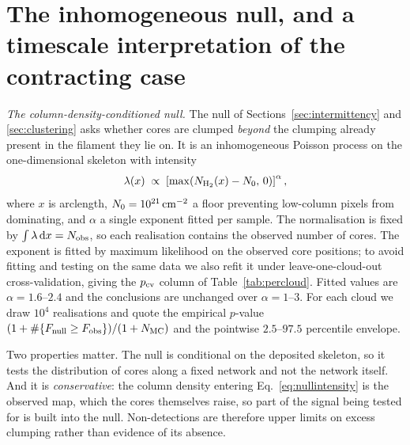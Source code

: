 \documentclass[usenatbib,twoside,twocolumn]{mnras}
\begin{document}
\section{The inhomogeneous null, and a timescale interpretation of the contracting case}
\label{sec:nullspec}

\emph{The column-density-conditioned null.} The null of Sections~\ref{sec:intermittency} and \ref{sec:clustering} asks whether cores are clumped \emph{beyond} the clumping already present in the filament they lie on. It is an inhomogeneous Poisson process on the one-dimensional skeleton with intensity
\begin{equation}
\lambda(x)\;\propto\;\left[\max\!\left(N_{\rm H_2}(x)-N_0,\,0\right)\right]^{\alpha},
\label{eq:nullintensity}
\end{equation}
where $x$ is arclength, $N_0=10^{21}\,{\rm cm^{-2}}$ a floor preventing low-column pixels from dominating, and $\alpha$ a single exponent fitted per sample. The normalisation is fixed by $\int\lambda\,{\rm d}x=N_{\rm obs}$, so each realisation contains the observed number of cores. The exponent is fitted by maximum likelihood on the observed core positions; to avoid fitting and testing on the same data we also refit it under leave-one-cloud-out cross-validation, giving the $p_{\rm cv}$ column of Table~\ref{tab:percloud}. Fitted values are $\alpha=1.6$--$2.4$ and the conclusions are unchanged over $\alpha=1$--$3$. For each cloud we draw $10^4$ realisations and quote the empirical $p$-value $(1+\#\{F_{\rm null}\geq F_{\rm obs}\})/(1+N_{\rm MC})$ and the pointwise $2.5$--$97.5$ percentile envelope.

Two properties matter. The null is conditional on the deposited skeleton, so it tests the distribution of cores along a fixed network and not the network itself. And it is \emph{conservative}: the column density entering Eq.~\ref{eq:nullintensity} is the observed map, which the cores themselves raise, so part of the signal being tested for is built into the null. Non-detections are therefore upper limits on excess clumping rather than evidence of its absence.
\end{document}
